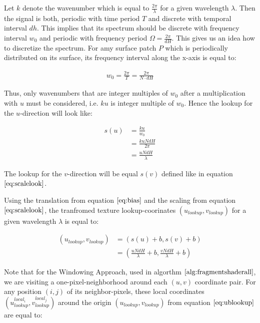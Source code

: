 Let $k$ denote the wavenumber which is equal to $\frac{2 \pi}{\lambda}$ for a given wavelength $\lambda$. Then the signal is both, periodic with time period $T$ and discrete with temporal interval $dh$. This implies that its spectrum should be discrete with frequency interval $w_0$ and periodic with frequency period $\Omega = \frac{2 \pi}{dH}$. This gives us an idea how to discretize the spectrum. For amy surface patch $P$ which is periodically distributed on its surface, its frequency interval along the x-axis is equal to: 

\begin{align}
  w_0 = \frac{2 \pi}{T} = \frac{2 \pi}{N \cdot dH}
\end{align}

Thus, only wavenumbers that are integer multiples of $w_0$ after a multiplication with $u$ must be considered, i.e. $ku$ is integer multiple of $w_0$. Hence the lookup for the $u$-direction will look like:

\begin{align}
    s(u)
    &=\frac{ku}{w_0} \nonumber \\
    &= \frac{ku N dH}{2 \pi} \nonumber \\
    &= \frac{u N dH}{\lambda}
\label{eq:scalelook}
\end{align}

The lookup for the $v$-direction will be equal $s(v)$ defined like in equation $\ref{eq:scalelook}$.

Using the translation from equation $\ref{eq:bias}$ and the scaling from equation $\ref{eq:scalelook}$, the tranfromed texture lookup-coorinates $(u_{lookup}, v_{lookup})$ for a given wavelength $\lambda$ is equal to:

\begin{align}
  (u_{lookup}, v_{lookup}) 
  &= \left(s(u)+b,s(v)+b \right) \nonumber \\
  &= \left( \frac{u N dH}{\lambda} + b, \frac{v N dH}{\lambda} + b \right)
\label{eq:ublookup}
\end{align}  

Note that for the Windowing Approach, used in algorthm $\ref{alg:fragmentshaderall}$, we are visiting a one-pixel-neighborhood around each $(u,v)$ coordinate pair. For any position $(i,j)$ of its neighbor-pixels, these local coordinates $(u_{lookup}^{local_i}, v_{lookup}^{local_j})$ around the origin $(u_{lookup}, v_{lookup})$ from equation $\ref{eq:ublookup}$ are equal to:


